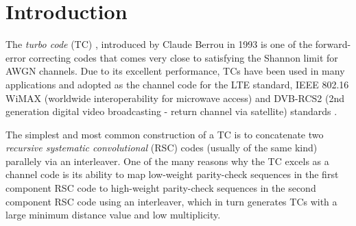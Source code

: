 \section{Introduction}

The {\it turbo code} (TC) \cite{ref1}, introduced by Claude Berrou in 1993 is one of the forward-error correcting codes that comes very close to satisfying the Shannon limit for AWGN channels.  Due to its excellent performance, TCs have been used in many applications and  adopted as the channel code for the LTE standard, IEEE 802.16 WiMAX (worldwide interoperability for microwave access) and DVB-RCS2 (2nd generation digital video broadcasting - return channel via satellite) standards \cite{ref7}.

 The simplest and most common construction of a TC is  to concatenate  two {\it recursive systematic convolutional} (RSC) codes (usually of the same kind) parallely  via an interleaver. One of the many reasons why the TC excels as a channel code is its ability to map low-weight parity-check sequences in the first component RSC code to high-weight parity-check sequences in the second component RSC code using an interleaver, which in turn generates TCs with a large minimum distance value and low multiplicity.


